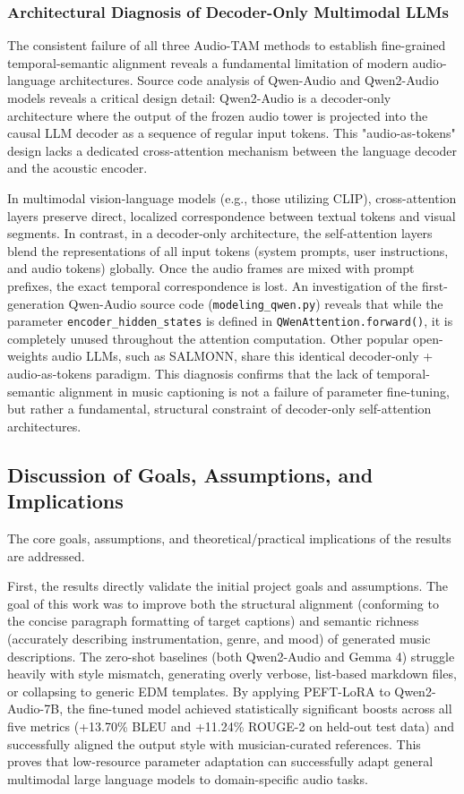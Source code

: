 \documentclass[12pt, conference, letterpaper]{IEEEtran}
\begin{document}
\subsubsection{Architectural Diagnosis of Decoder-Only Multimodal LLMs}
The consistent failure of all three Audio-TAM methods to establish fine-grained temporal-semantic alignment reveals a fundamental limitation of modern audio-language architectures. Source code analysis of Qwen-Audio and Qwen2-Audio models reveals a critical design detail: Qwen2-Audio is a decoder-only architecture where the output of the frozen audio tower is projected into the causal LLM decoder as a sequence of regular input tokens. This "audio-as-tokens" design lacks a dedicated cross-attention mechanism between the language decoder and the acoustic encoder.

In multimodal vision-language models (e.g., those utilizing CLIP), cross-attention layers preserve direct, localized correspondence between textual tokens and visual segments. In contrast, in a decoder-only architecture, the self-attention layers blend the representations of all input tokens (system prompts, user instructions, and audio tokens) globally. Once the audio frames are mixed with prompt prefixes, the exact temporal correspondence is lost. An investigation of the first-generation Qwen-Audio source code (\texttt{modeling\_qwen.py}) reveals that while the parameter \texttt{encoder\_hidden\_states} is defined in \texttt{QWenAttention.forward()}, it is completely unused throughout the attention computation. Other popular open-weights audio LLMs, such as SALMONN, share this identical decoder-only + audio-as-tokens paradigm. This diagnosis confirms that the lack of temporal-semantic alignment in music captioning is not a failure of parameter fine-tuning, but rather a fundamental, structural constraint of decoder-only self-attention architectures.

\subsection{Discussion of Goals, Assumptions, and Implications}

The core goals, assumptions, and theoretical/practical implications of the results are addressed.

First, the results directly validate the initial project goals and assumptions. The goal of this work was to improve both the structural alignment (conforming to the concise paragraph formatting of target captions) and semantic richness (accurately describing instrumentation, genre, and mood) of generated music descriptions. The zero-shot baselines (both Qwen2-Audio and Gemma 4) struggle heavily with style mismatch, generating overly verbose, list-based markdown files, or collapsing to generic EDM templates. By applying PEFT-LoRA to Qwen2-Audio-7B, the fine-tuned model achieved statistically significant boosts across all five metrics (+13.70\% BLEU and +11.24\% ROUGE-2 on held-out test data) and successfully aligned the output style with musician-curated references. This proves that low-resource parameter adaptation can successfully adapt general multimodal large language models to domain-specific audio tasks.
\end{document}
